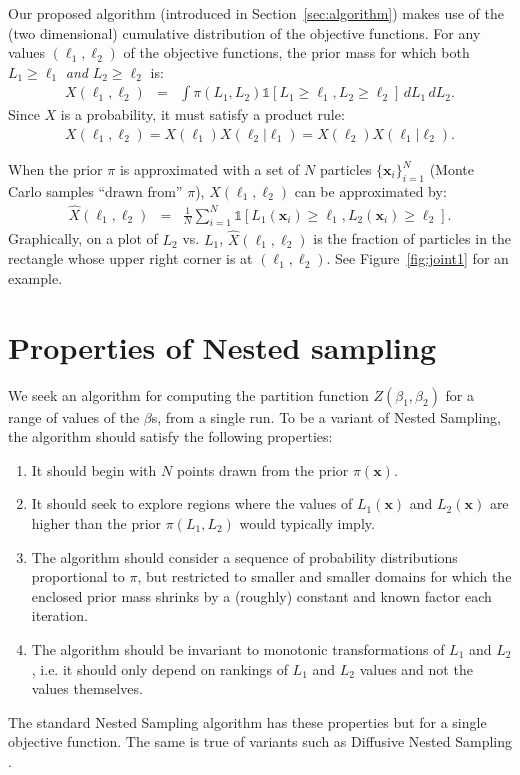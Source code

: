 \documentclass[journal,article,accept,moreauthors,pdftex,12pt,a4paper]{mdpi}
\newcommand{\xx}{\boldsymbol{x}}
\begin{document}
Our proposed algorithm (introduced in Section~\ref{sec:algorithm}) makes use
of the (two dimensional) cumulative distribution of the objective functions.
For any values $(\ell_1, \ell_2)$ of the objective functions,
the prior mass for which both $L_1 \geq \ell_1$ {\em and} $L_2 \geq \ell_2$ is:
\begin{eqnarray}
X(\ell_1, \ell_2) &=& \int \pi(L_1, L_2)
\mathds{1}\left[L_1 \geq \ell_1, L_2 \geq \ell_2 \right]
 \, dL_1 \, dL_2.
\end{eqnarray}
Since $X$ is a probability, it must satisfy a product rule:
\begin{eqnarray}
X(\ell_1, \ell_2) = X(\ell_1)X(\ell_2 | \ell_1) = X(\ell_2)X(\ell_1 | \ell_2).
\end{eqnarray}

When the prior $\pi$ is approximated with a set of $N$
particles $\{\xx_i\}_{i=1}^N$
(Monte Carlo samples ``drawn from'' $\pi$),
$X(\ell_1, \ell_2)$ can be approximated by:
\begin{eqnarray}
\hat{X}(\ell_1, \ell_2) &=&
\frac{1}{N}
\sum_{i=1}^N \mathds{1}\left[L_1(\xx_i) \geq \ell_1,
L_2(\xx_i) \geq \ell_2\right].\label{eqn:corner_count}
\end{eqnarray}
Graphically, on a plot of $L_2$ vs. $L_1$, $\hat{X}(\ell_1, \ell_2)$
is the fraction of particles in the rectangle whose upper right corner is at
$\left(\ell_1, \ell_2\right)$. See Figure~\ref{fig:joint1} for an
example.

\section{Properties of Nested sampling}

We seek an algorithm for computing the partition function
$Z(\beta_1, \beta_2)$ for a range of values of the $\beta$s, from a single
run. To be a variant of Nested Sampling, the algorithm should satisfy
the following properties:
\begin{enumerate}
\item It should begin with $N$ points drawn from the prior $\pi(\xx)$.
\item It should seek to explore regions where the values of
$L_1(\xx)$ and $L_2(\xx)$ are higher than the prior $\pi(L_1, L_2)$
would typically imply.
\item The algorithm should consider a sequence of probability
distributions proportional to $\pi$, but restricted to smaller and smaller
domains for which the enclosed prior mass shrinks by a (roughly) constant and
known factor each iteration.
\item The algorithm should be invariant to monotonic transformations of
$L_1$ and $L_2$, i.e. it should only depend on rankings of $L_1$ and $L_2$
values and not the values themselves.
\end{enumerate}
The standard Nested Sampling algorithm has these properties but for a
single objective function. The same is true of variants such as
Diffusive Nested Sampling \citep{dnest}.
\end{document}
